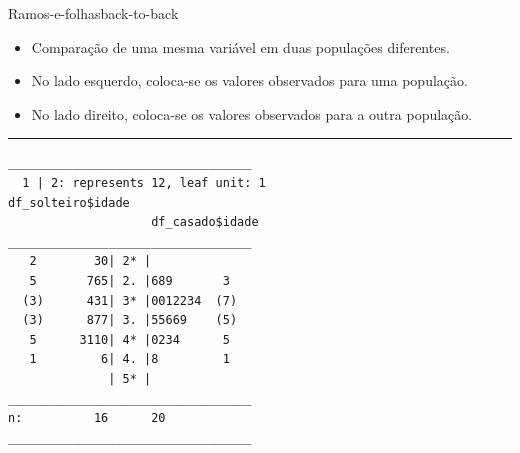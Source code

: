 \documentclass[
  10pt,
  ignorenonframetext,
]{beamer}
\newenvironment{Shaded}{\begin{snugshade}}{\end{snugshade}}
\newcommand{\AttributeTok}[1]{\textcolor[rgb]{0.40,0.45,0.13}{#1}}
\newcommand{\DecValTok}[1]{\textcolor[rgb]{0.68,0.00,0.00}{#1}}
\newcommand{\FunctionTok}[1]{\textcolor[rgb]{0.28,0.35,0.67}{#1}}
\newcommand{\NormalTok}[1]{\textcolor[rgb]{0.00,0.23,0.31}{#1}}
\newcommand{\OtherTok}[1]{\textcolor[rgb]{0.00,0.23,0.31}{#1}}
\newcommand{\SpecialCharTok}[1]{\textcolor[rgb]{0.37,0.37,0.37}{#1}}
\newcommand{\StringTok}[1]{\textcolor[rgb]{0.13,0.47,0.30}{#1}}
\providecommand{\tightlist}{%
  \setlength{\itemsep}{0pt}\setlength{\parskip}{0pt}}\usepackage{longtable,booktabs,array}
\newcommand*{\regrafina}{\rule{\textwidth}{0.5pt}}
\begin{document}
\begin{frame}[fragile]{Ramos-e-folhas\newline back-to-back}
\protect\hypertarget{ramos-e-folhasback-to-back}{}
\begin{itemize}
\tightlist
\item
  Comparação de uma mesma variável em duas populações diferentes.
\item
  No lado esquerdo, coloca-se os valores observados para uma população.
\item
  No lado direito, coloca-se os valores observados para a outra
  população.
\end{itemize}

\regrafina

\small

\begin{Shaded}
\end{Shaded}

\normalsize
\end{frame}

\begin{frame}[fragile]
\begin{verbatim}
__________________________________
  1 | 2: represents 12, leaf unit: 1 
df_solteiro$idade
                    df_casado$idade
__________________________________
   2        30| 2* |              
   5       765| 2. |689       3   
  (3)      431| 3* |0012234  (7)  
  (3)      877| 3. |55669    (5)  
   5      3110| 4* |0234      5   
   1         6| 4. |8         1   
              | 5* |              
__________________________________
n:          16      20        
__________________________________
\end{verbatim}
\end{frame}
\end{document}
